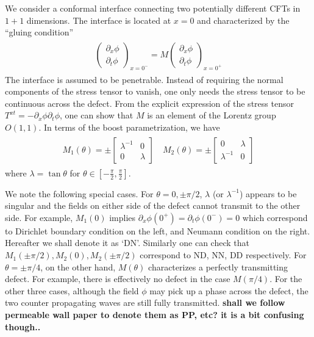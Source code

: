 We consider a conformal interface connecting two potentially different CFTs in $1+1$ dimensions. The interface is located at $x=0$ and characterized by the ``gluing condition''
\begin{eqnarray}\begin{aligned}
\label{eq:def_M}
\begin{pmatrix}
\partial_x\phi\\
\partial_t\phi
\end{pmatrix}_{x=0^-}
=M\begin{pmatrix}
\partial_x\phi\\
\partial_t\phi
\end{pmatrix}_{x=0^+}
\end{aligned}\end{eqnarray}
The interface is assumed to be penetrable. Instead of requiring the normal components of the stress tensor to vanish\cite{cardy_conformal_1984}, one only needs the stress tensor to be continuous across the defect. From the explicit expression of the stress tensor $T^{xt}=-\partial_x\phi\partial_t\phi$, one can show that\cite{bachas_permeable_2002} $M$ is an element of the Lorentz group $O(1,1)$. In terms of the boost parametrization, we have
\begin{eqnarray}\begin{aligned}
M_1(\theta)=\pm
\begin{bmatrix}
\lambda^{-1} & 0 \\
0 & \lambda
\end{bmatrix}\quad
M_2(\theta)=\pm
\begin{bmatrix}
0 & \lambda  \\
\lambda^{-1} & 0 
\end{bmatrix}
\end{aligned}\end{eqnarray}
where $\lambda=\tan\theta$ for $\theta\in\left[-\frac{\pi}{2},\frac{\pi}{2}\right]$. 

We note the following special cases. For $\theta=0,\pm\pi/2$, $\lambda$ (or $\lambda^{-1}$) appears to be singular and the fields on either side of the defect cannot transmit to the other side. For example, $M_1(0)$ implies $\partial_x\phi(0^+)=\partial_t\phi(0^-)=0$ which correspond to Dirichlet boundary condition on the left, and Neumann condition on the right. Hereafter we shall denote it as `DN'. Similarly one can check that $M_1(\pm\pi/2),M_2(0),M_2(\pm\pi/2)$ correspond to ND, NN, DD respectively. For $\theta=\pm\pi/4$, on the other hand, $M(\theta)$ characterizes a perfectly transmitting defect. For example, there is effectively no defect in the case $M(\pi/4)$. For the other three cases, although the field $\phi$ may pick up a phase across the defect, the two counter propagating waves are still fully transmitted. {\bf\color{red} shall we follow permeable wall paper to denote them as PP, etc? it is a bit confusing though..}

